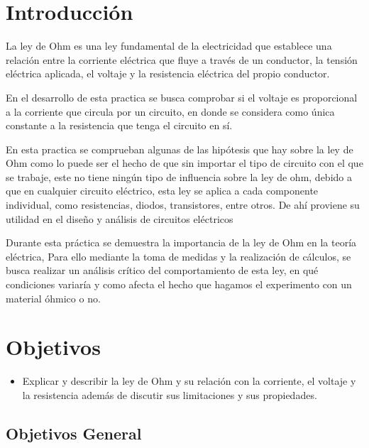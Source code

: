 \documentclass[10pt]{article}
\begin{document}
\begin{multicols}{2}

	\section{Introducción}

	La ley de Ohm es una ley fundamental de la electricidad que establece una
	relación entre la corriente eléctrica que fluye a través de un conductor,
	la tensión eléctrica aplicada, el voltaje y la resistencia eléctrica del
	propio conductor.

	En el desarrollo de esta practica se busca comprobar si el voltaje es
	proporcional a la corriente que circula por un circuito, en donde se
	considera como única constante a la resistencia que tenga el circuito en sí.

	En esta practica se comprueban algunas de las hipótesis que hay sobre la
	ley de Ohm como lo puede ser el hecho de que sin importar el tipo de
	circuito  con el que se trabaje, este  no tiene ningún tipo de influencia
	sobre la ley de ohm, debido a que en cualquier circuito eléctrico, esta ley
	se aplica a cada componente individual, como resistencias, diodos,
	transistores, entre otros.  De ahí proviene su utilidad en el diseño y
	análisis de circuitos eléctricos

	Durante esta práctica se demuestra la importancia de la ley de Ohm en la
	teoría eléctrica, Para ello mediante la toma de medidas y la realización
	de cálculos, se busca realizar un análisis crítico del comportamiento de
	esta ley, en qué condiciones variaría y como afecta el hecho que hagamos
	el experimento con un material óhmico o no.


	\section{Objetivos}

	\begin{itemize}
		\item Explicar y describir la ley de Ohm y su relación con la
		      corriente, el voltaje y la resistencia además de discutir sus
		      limitaciones y sus propiedades.
	\end{itemize}

	\subsection{Objetivos General}


\end{multicols}
\end{document}
